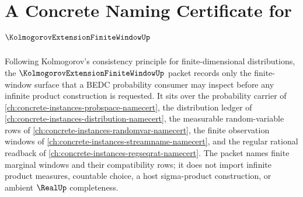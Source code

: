 \chapter{A Concrete Naming Certificate for $\KolmogorovExtensionFiniteWindowUp$}
\label{ch:concrete-instances-kolmogorov-extension-finite-window-namecert}

Following Kolmogorov's consistency principle for finite-dimensional distributions, the $\KolmogorovExtensionFiniteWindowUp$ packet records only the finite-window surface that a BEDC probability consumer may inspect before any infinite product construction is requested. It sits over the probability carrier of \autoref{ch:concrete-instances-probspace-namecert}, the distribution ledger of \autoref{ch:concrete-instances-distribution-namecert}, the measurable random-variable rows of \autoref{ch:concrete-instances-randomvar-namecert}, the finite observation windows of \autoref{ch:concrete-instances-streamname-namecert}, and the regular rational readback of \autoref{ch:concrete-instances-regseqrat-namecert}. The packet names finite marginal windows and their compatibility rows; it does not import infinite product measures, countable choice, a host sigma-product construction, or ambient $\RealUp$ completeness.

